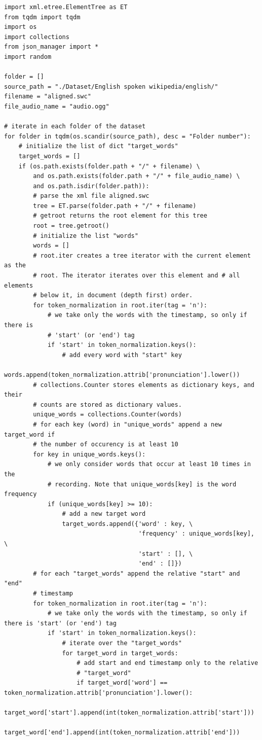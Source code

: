 \documentclass[12pt,a4paper,titlepage]{article}
\begin{document}
\begin{lstlisting}[language=iPython,firstnumber=1, caption=find\_target\_words.py, label=find_target_words,captionpos=b]
import xml.etree.ElementTree as ET
from tqdm import tqdm
import os
import collections
from json_manager import *
import random

folder = []
source_path = "./Dataset/English spoken wikipedia/english/"
filename = "aligned.swc"
file_audio_name = "audio.ogg"

# iterate in each folder of the dataset
for folder in tqdm(os.scandir(source_path), desc = "Folder number"):
    # initialize the list of dict "target_words"
    target_words = []
    if (os.path.exists(folder.path + "/" + filename) \
        and os.path.exists(folder.path + "/" + file_audio_name) \
        and os.path.isdir(folder.path)):  
        # parse the xml file aligned.swc
        tree = ET.parse(folder.path + "/" + filename)
        # getroot returns the root element for this tree
        root = tree.getroot()
        # initialize the list "words"
        words = []
        # root.iter creates a tree iterator with the current element as the 
        # root. The iterator iterates over this element and # all elements 
        # below it, in document (depth first) order.
        for token_normalization in root.iter(tag = 'n'):
            # we take only the words with the timestamp, so only if there is
            # 'start' (or 'end') tag
            if 'start' in token_normalization.keys():
                # add every word with "start" key
                words.append(token_normalization.attrib['pronunciation'].lower())
        # collections.Counter stores elements as dictionary keys, and their
        # counts are stored as dictionary values.
        unique_words = collections.Counter(words)
        # for each key (word) in "unique_words" append a new target_word if
        # the number of occurency is at least 10
        for key in unique_words.keys():
            # we only consider words that occur at least 10 times in the
            # recording. Note that unique_words[key] is the word frequency
            if (unique_words[key] >= 10):
                # add a new target word
                target_words.append({'word' : key, \
                                     'frequency' : unique_words[key], \
                                     'start' : [], \
                                     'end' : []})
        # for each "target_words" append the relative "start" and "end"
        # timestamp
        for token_normalization in root.iter(tag = 'n'):
            # we take only the words with the timestamp, so only if there is 'start' (or 'end') tag
            if 'start' in token_normalization.keys():
                # iterate over the "target_words"
                for target_word in target_words:
                    # add start and end timestamp only to the relative
                    # "target_word"
                    if target_word['word'] == token_normalization.attrib['pronunciation'].lower():
                        target_word['start'].append(int(token_normalization.attrib['start']))
                        target_word['end'].append(int(token_normalization.attrib['end']))


\end{lstlisting}
\end{document}
